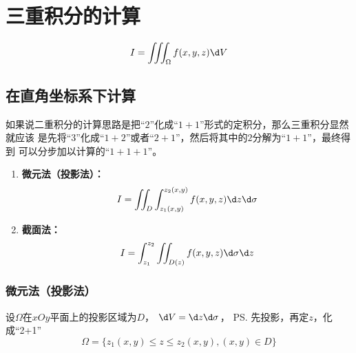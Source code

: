 \section{三重积分的计算}

$${I=\iiint_{\Omega}f(x,y,z)\d V}$$

\subsection{在直角坐标系下计算}

如果说二重积分的计算思路是把“$2$”化成“$1+1$”形式的定积分，那么三重积分显然就应该
是先将“$3$”化成“$1+2$”或者“$2+1$”，然后将其中的$2$分解为“$1+1$”，最终得到
可以分步加以计算的“$1+1+1$”。

\begin{thx}
	\begin{enumerate}
	  \item {\bf 微元法（投影法）：}
	  $$I=\iint_D\int_{z_1(x,y)}^{z_2(x,y)}f(x,y,z)\d z\d\sigma$$
	  \item {\bf 截面法：}
	  $$I=\int_{z_1}^{z_2}\iint_{D(z)}f(x,y,z)\d\sigma \d z$$
	\end{enumerate}
\end{thx}

\subsubsection{微元法（投影法）}

设$\Omega$在$xOy$平面上的投影区域为$D$， $\d V=\d z\d\sigma$， 
\ps{先投影，再定$z$，化成“2+1”}
$$\Omega=\{z_1(x,y)\leq z\leq z_2(x,y), (x,y)\in D\}$$

\begin{center}
\end{center}

